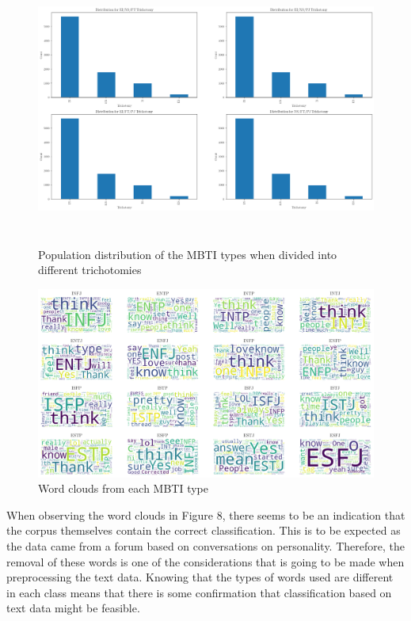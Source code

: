 \documentclass[11pt,a4paper]{article}
\begin{document}
	\begin{figure}[h!]
		\centering
		
		\includegraphics[height=9cm]{../output/visualisations/trichotomy_dist}
		
		\caption{Population distribution of the MBTI types when divided into different trichotomies}
		
	\end{figure}

	\begin{figure}[h!]
		\centering
		
		\includegraphics[width=\textwidth]{../output/visualisations/wc}
		
		\caption{Word clouds from each MBTI type}
		
	\end{figure}

	When observing the word clouds in Figure 8, there seems to be an indication that the corpus themselves contain the correct classification. This is to be expected as the data came from a forum based on conversations on personality. Therefore, the removal of these words is one of the considerations that is going to be made when preprocessing the text data. Knowing that the types of words used are different in each class means that there is some confirmation that classification based on text data might be feasible.
	
\end{document}
